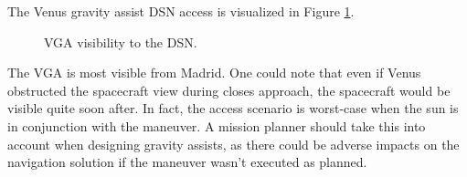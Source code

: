 \documentclass[]{aiaa-tc}%
\begin{document}
The Venus gravity assist DSN access is visualized in Figure \ref{fig:VGA_Access}.
	\begin{figure}[H]
		\centering
		\caption{VGA visibility to the DSN. }
		\label{fig:VGA_Access}
	\end{figure}	

The VGA is most visible from Madrid. One could note that even if Venus obstructed the spacecraft view during closes approach, the spacecraft would be visible quite soon after. In fact, the access scenario is worst-case when the sun is in conjunction with the maneuver. A mission planner should take this into account when designing gravity assists, as there could be adverse impacts on the navigation solution if the maneuver wasn't executed as planned.

	\vspace{5 mm}
\end{document}
